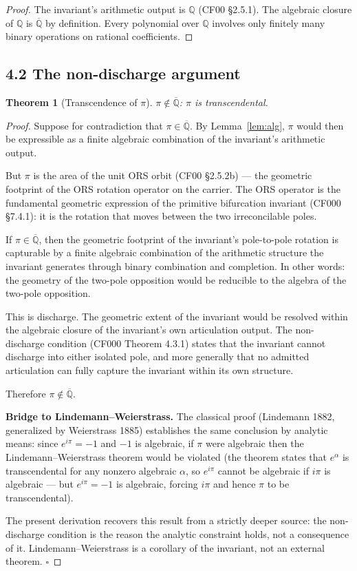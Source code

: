 \documentclass[11pt]{article}
\newtheorem{theorem}{Theorem}[section]
\theoremstyle{definition}
\theoremstyle{remark}
\begin{document}
\begin{proof}
The invariant's arithmetic output is $\mathbb{Q}$ (CF00 \S 2.5.1). The
algebraic closure of $\mathbb{Q}$ is $\overline{\mathbb{Q}}$ by
definition. Every polynomial over $\mathbb{Q}$ involves only finitely
many binary operations on rational coefficients.
\end{proof}

\subsection{4.2 The non-discharge argument}

\begin{theorem}[Transcendence of $\pi$]\label{thm:pitrans}
$\pi\notin\overline{\mathbb{Q}}$: $\pi$ is transcendental.
\end{theorem}

\begin{proof}
Suppose for contradiction that $\pi\in\overline{\mathbb{Q}}$. By
Lemma~\ref{lem:alg}, $\pi$ would then be expressible as a finite
algebraic combination of the invariant's arithmetic output.

But $\pi$ is the area of the unit ORS orbit (CF00 \S 2.5.2b) --- the
geometric footprint of the ORS rotation operator on the carrier. The
ORS operator is the fundamental geometric expression of the primitive
bifurcation invariant (CF000 \S 7.4.1): it is the rotation that moves
between the two irreconcilable poles.

If $\pi\in\overline{\mathbb{Q}}$, then the geometric footprint of the
invariant's pole-to-pole rotation is capturable by a finite algebraic
combination of the arithmetic structure the invariant generates through
binary combination and completion. In other words: the geometry of the
two-pole opposition would be reducible to the algebra of the two-pole
opposition.

This is discharge. The geometric extent of the invariant would be
resolved within the algebraic closure of the invariant's own
articulation output. The non-discharge condition (CF000 Theorem 4.3.1)
states that the invariant cannot discharge into either isolated pole,
and more generally that no admitted articulation can fully capture the
invariant within its own structure.

Therefore $\pi\notin\overline{\mathbb{Q}}$.

\medskip
\noindent\textbf{Bridge to Lindemann--Weierstrass.} The classical
proof (Lindemann 1882, generalized by Weierstrass 1885) establishes
the same conclusion by analytic means: since $e^{i\pi}=-1$ and $-1$
is algebraic, if $\pi$ were algebraic then the Lindemann--Weierstrass
theorem would be violated (the theorem states that $e^\alpha$ is
transcendental for any nonzero algebraic $\alpha$, so $e^{i\pi}$
cannot be algebraic if $i\pi$ is algebraic --- but $e^{i\pi}=-1$ is
algebraic, forcing $i\pi$ and hence $\pi$ to be transcendental).

The present derivation recovers this result from a strictly deeper
source: the non-discharge condition is the reason the analytic
constraint holds, not a consequence of it. Lindemann--Weierstrass is
a corollary of the invariant, not an external theorem. $\square$
\end{proof}
\end{document}
